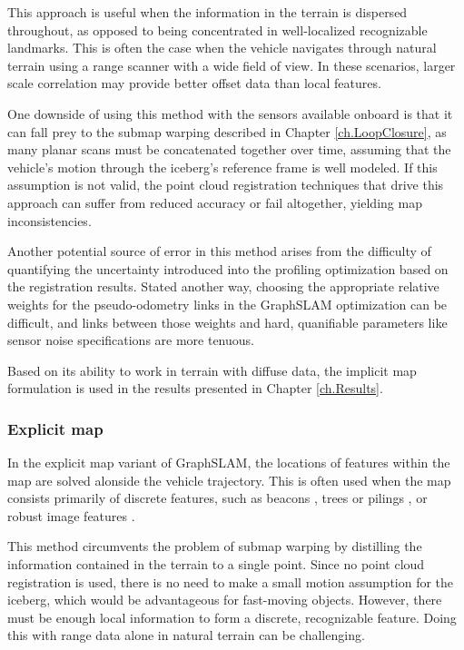 This approach is useful when the information in the terrain is dispersed throughout, as opposed to being concentrated in well-localized recognizable landmarks. This is often the case when the vehicle navigates through natural terrain using a range scanner with a wide field of view. In these scenarios, larger scale correlation may provide better offset data than local features. 

One downside of using this method with the sensors available onboard is that it can fall prey to the submap warping described in Chapter \ref{ch.LoopClosure}, as many planar scans must be concatenated together over time, assuming that the vehicle's motion through the iceberg's reference frame is well modeled. If this assumption is not valid, the point cloud registration techniques that drive this approach can suffer from reduced accuracy or fail altogether, yielding map inconsistencies. 

Another potential source of error in this method arises from the difficulty of quantifying the uncertainty introduced into the profiling optimization based on the registration results. Stated another way, choosing the appropriate relative weights for the pseudo-odometry links in the GraphSLAM optimization can be difficult, and links between those weights and hard, quanifiable parameters like sensor noise specifications are more tenuous.  

Based on its ability to work in terrain with diffuse data, the implicit map formulation is used in the results presented in Chapter \ref{ch.Results}.


\subsubsection{Explicit map} 

In the explicit map variant of GraphSLAM, the locations of features within the map are solved alonside the vehicle trajectory. This is often used when the map consists primarily of discrete features, such as beacons \cite{Olson2006}, trees or pilings \cite{Langelaan2005}, or robust image features \cite{Augenstein2011a}.

This method circumvents the problem of submap warping by distilling the information contained in the terrain to a single point. Since no point cloud registration is used, there is no need to make a small motion assumption for the iceberg, which  would be advantageous for fast-moving objects. However, there must be enough local information to form a discrete, recognizable feature. Doing this with range data alone in natural terrain can be challenging. 


